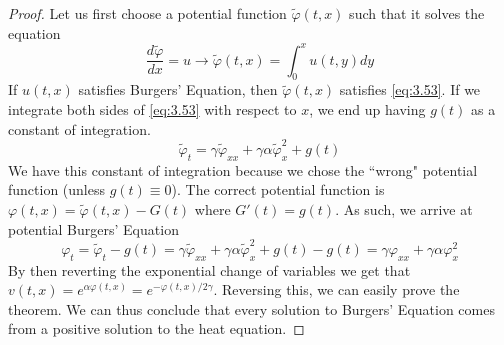 \documentclass{article}
\newcommand{\od}[2]{\frac{d #1}{d #2}}
\numberwithin{equation}{section}
\begin{document}
\begin{proof}
    Let us first choose a potential function $\tilde{\varphi} (t,x) $ such that it solves the equation 
    \begin{equation*}
        \od{\tilde{\varphi}}{x} = u \rightarrow \tilde{\varphi}(t,x) = \int^x_0 u(t,y)dy
    \end{equation*}
    If $u(t,x)$ satisfies Burgers' Equation, then $\tilde{\varphi}(t,x)$ satisfies \eqref{eq:3.53}. If we integrate both sides of \eqref{eq:3.53} with respect to $x$, we end up having $g(t)$ as a constant of integration.
    \begin{equation*}
        \tilde{\varphi}_t = \gamma \tilde{\varphi}_{xx} +\gamma \alpha \tilde{\varphi}_x^2 + g(t)
    \end{equation*}
    We have this constant of integration because we chose the ``wrong" potential function (unless $g(t) \equiv 0$). The correct potential function is $\varphi(t,x) = \tilde{\varphi}(t,x) -G(t)$ where $G'(t) = g(t)$. As such, we arrive at potential Burgers' Equation
    \begin{equation*}
        \varphi_t = \tilde{\varphi}_t - g(t) = \gamma \tilde{\varphi}_{xx} +\gamma \alpha \tilde{\varphi}_x^2 + g(t) - g(t) =\gamma \varphi_{xx} +\gamma \alpha \varphi_x^2
    \end{equation*}
    By then reverting the exponential change of variables we get that $v(t,x) = e^{\alpha \varphi(t,x)}=e^{-\varphi (t,x)/2\gamma}$. Reversing this, we can easily prove the theorem. We can thus conclude that every solution to Burgers' Equation comes from a positive solution to the heat equation.
\end{proof}
\end{document}
